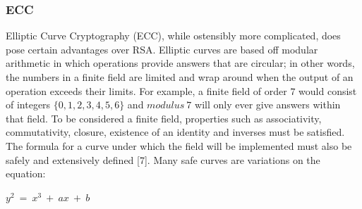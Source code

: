 \documentclass[conference,compsoc]{IEEEtran}
\begin{document}
\subsubsection{ECC}
Elliptic Curve Cryptography (ECC), while ostensibly more complicated, does pose certain advantages over RSA. Elliptic curves are based off modular arithmetic in which operations provide answers that are circular; in other words, the numbers in a finite field are limited and wrap around when the output of an operation exceeds their limits. For example, a finite field of order $7$ would consist of integers $\{0, 1, 2, 3, 4, 5, 6\}$ and $modulus~ 7$ will only ever give answers within that field. To be considered a finite field, properties such as associativity, commutativity, closure, existence of an identity and inverses must be satisfied. The formula for a curve under which the field will be implemented must also be safely and extensively defined [7]. Many safe curves are variations on the equation:\\

\begin{center}
\large $y^2~ = ~x^3~ +~ ax~ +~ b$
\break
\end{center} 
\end{document}
